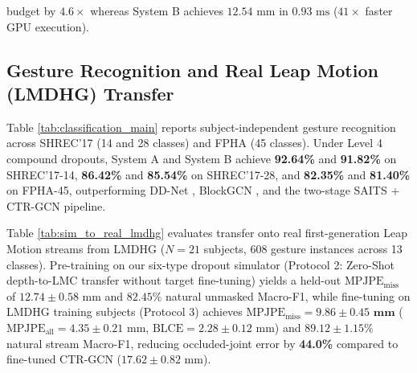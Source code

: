 \documentclass[10pt,twocolumn]{article}
\begin{document}
budget by $4.6\times$ whereas System B achieves $12.54\text{ mm}$ in $0.93\text{ ms}$ ($41\times$ faster GPU execution).

\subsection{Gesture Recognition and Real Leap Motion (LMDHG) Transfer}
Table \ref{tab:classification_main} reports subject-independent gesture recognition across SHREC'17 (14 and 28 classes) and FPHA (45 classes). Under Level 4 compound dropouts, System A and System B achieve \textbf{92.64\%} and \textbf{91.82\%} on SHREC'17-14, \textbf{86.42\%} and \textbf{85.54\%} on SHREC'17-28, and \textbf{82.35\%} and \textbf{81.40\%} on FPHA-45, outperforming DD-Net \cite{yang2019make}, BlockGCN \cite{zhou2024blockgcn}, and the two-stage SAITS + CTR-GCN pipeline.

Table \ref{tab:sim_to_real_lmdhg} evaluates transfer onto real first-generation Leap Motion streams from LMDHG \cite{boulahia2017dynamic} ($N=21$ subjects, $608$ gesture instances across 13 classes). Pre-training on our six-type dropout simulator (Protocol 2: Zero-Shot depth-to-LMC transfer without target fine-tuning) yields a held-out $\text{MPJPE}_{\text{miss}}$ of $12.74 \pm 0.58\text{ mm}$ and $82.45\%$ natural unmasked Macro-F1, while fine-tuning on LMDHG training subjects (Protocol 3) achieves $\text{MPJPE}_{\text{miss}} = \mathbf{9.86 \pm 0.45\text{ mm}}$ ($\text{MPJPE}_{\text{all}} = 4.35 \pm 0.21\text{ mm}$, $\text{BLCE} = 2.28 \pm 0.12\text{ mm}$) and $\mathbf{89.12 \pm 1.15\%}$ natural stream Macro-F1, reducing occluded-joint error by \textbf{44.0\%} compared to fine-tuned CTR-GCN ($17.62 \pm 0.82\text{ mm}$).
\end{document}
